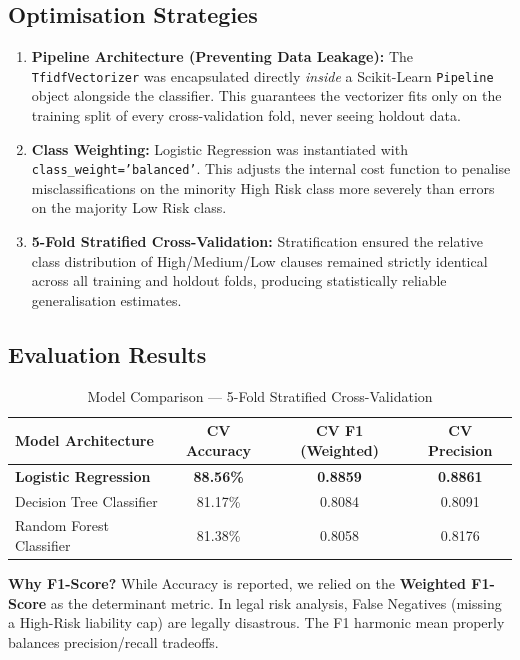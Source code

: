 \documentclass[12pt,a4paper]{article}
\begin{document}
\subsection{Optimisation Strategies}

\begin{enumerate}[label=\textbf{\arabic*.}]
    \item \textbf{Pipeline Architecture (Preventing Data Leakage):} The
    \texttt{TfidfVectorizer} was encapsulated directly \emph{inside} a Scikit-Learn
    \texttt{Pipeline} object alongside the classifier. This guarantees the vectorizer
    fits only on the training split of every cross-validation fold, never seeing
    holdout data.

    \item \textbf{Class Weighting:} Logistic Regression was instantiated with
    \texttt{class\_weight='balanced'}. This adjusts the internal cost function to
    penalise misclassifications on the minority High Risk class more severely than
    errors on the majority Low Risk class.

    \item \textbf{5-Fold Stratified Cross-Validation:} Stratification ensured the
    relative class distribution of High/Medium/Low clauses remained strictly identical
    across all training and holdout folds, producing statistically reliable generalisa\-tion estimates.
\end{enumerate}

\subsection{Evaluation Results}

\begin{table}[h]
\centering
\begin{tabular}{@{}lccc@{}}
\toprule
\textbf{Model Architecture} & \textbf{CV Accuracy} & \textbf{CV F1 (Weighted)} & \textbf{CV Precision} \\
\midrule
\textbf{Logistic Regression} & \textbf{88.56\%} & \textbf{0.8859} & \textbf{0.8861} \\
Decision Tree Classifier & 81.17\% & 0.8084 & 0.8091 \\
Random Forest Classifier & 81.38\% & 0.8058 & 0.8176 \\
\bottomrule
\end{tabular}
\caption{Model Comparison --- 5-Fold Stratified Cross-Validation}
\end{table}

\textbf{Why F1-Score?} While Accuracy is reported, we relied on the \textbf{Weighted
F1-Score} as the determinant metric. In legal risk analysis, False Negatives
(missing a High-Risk liability cap) are legally disastrous. The F1 harmonic mean
properly balances precision/recall tradeoffs.
\end{document}
